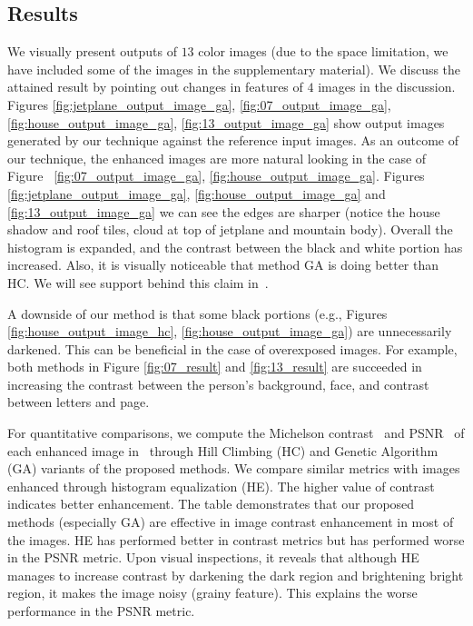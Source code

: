 \subsection{Results}
\label{subsection:exp_result_result}

We visually present outputs of $13$ color images 
(due to the space limitation, we have included some of the images in the supplementary material). 
We discuss the attained result by pointing out changes in features of $4$ images in the discussion. Figures \ref{fig:jetplane_output_image_ga}, \ref{fig:07_output_image_ga}, \ref{fig:house_output_image_ga}, \ref{fig:13_output_image_ga} show output images generated by our technique against the reference input images.
As an outcome of our technique, the enhanced images are more natural looking in the case of Figure ~\ref{fig:07_output_image_ga}, \ref{fig:house_output_image_ga}. Figures \ref{fig:jetplane_output_image_ga},
\ref{fig:house_output_image_ga} and \ref{fig:13_output_image_ga} we can see the edges are sharper (notice the house shadow and roof tiles, cloud at top of jetplane and mountain body). Overall the histogram is expanded, and the contrast between the black and white portion has increased. Also, it is visually noticeable that method GA is doing better than HC. We will see support behind this claim in~.

A downside of our method is that some black portions (e.g., Figures \ref{fig:house_output_image_hc}, \ref{fig:house_output_image_ga}) are unnecessarily darkened. This can be beneficial in the case of overexposed images. For example, both methods in Figure \ref{fig:07_result} and \ref{fig:13_result} are succeeded in increasing the contrast between the person's background, face, and contrast between letters and page.

For quantitative comparisons, we compute the Michelson contrast~\cite{rizzi2004proposal} and PSNR~\cite{asamoah2018measuring} of each enhanced image in~ through Hill Climbing (HC) and Genetic Algorithm (GA) variants of the proposed methods. We compare similar metrics with images enhanced through histogram equalization (HE). The higher value of contrast indicates better enhancement. The table demonstrates that our proposed methods (especially GA) are effective in image contrast enhancement in most of the images. HE has performed better in contrast metrics but has performed worse in the PSNR metric. Upon visual inspections, it reveals that although HE manages to increase contrast by darkening the dark region and brightening bright region, it makes the image noisy (grainy feature). This explains the worse performance in the PSNR metric. 

